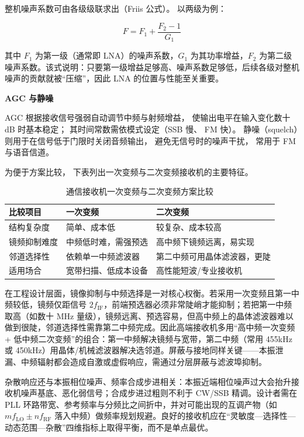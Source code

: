 整机噪声系数可由各级级联求出（Friis 公式）。
以两级为例：

\[
F=F_1+\frac{F_2-1}{G_1}
\]

其中 $F_1$ 为第一级（通常即 LNA）的噪声系数，$G_1$ 为其功率增益，$F_2$ 为第二级噪声系数。该式说明：只要第一级增益足够高、噪声系数足够低，后续各级对整机噪声的贡献就被“压缩”，因此 LNA 的位置与性能至关重要。

\medskip\noindent\textbf{AGC 与静噪}

AGC 根据接收信号强弱自动调节中频与射频增益，
使输出电平在输入变化数十 dB 时基本稳定；
其时间常数需依模式设定（SSB 慢、
FM 快）。
静噪（squelch）则用于在信号低于门限时关闭音频输出，
避免无信号时的噪声干扰，
常用于 FM 与语音信道。

为便于方案比较，
下表列出一次变频与二次变频接收机的主要特征。

\begin{table}[htbp]
\centering
\caption{通信接收机一次变频与二次变频方案比较}
\begin{tabular}{|p{4.5cm}|p{5cm}|p{5cm}|}
\hline
\textbf{比较项目} & \textbf{一次变频} & \textbf{二次变频} \\
\hline
结构复杂度 & 简单、成本低 & 较复杂、成本较高 \\
\hline
镜频抑制难度 & 中频低时难，需强预选 & 高中频下镜频远离，易实现 \\
\hline
邻道选择性 & 依赖单一中频滤波器 & 第二中频可用晶体滤波器，更陡 \\
\hline
适用场合 & 宽带扫描、低成本设备 & 高性能短波/专业接收机 \\
\hline
\end{tabular}
\end{table}

在工程设计层面，镜像抑制与中频选择是一对核心权衡。若采用一次变频且第一中频较低，镜频仅距信号 $2f_{\mathrm{IF}}$，前端预选器必须非常陡峭才能抑制；若把第一中频取高（如数十 MHz 量级），镜频远离、预选容易，但高中频上的晶体滤波器难以做到很陡，邻道选择性需靠第二中频完成。因此高端接收机多用“高中频一次变频 + 低中频二次变频”的组合：第一中频解决镜频与宽带，第二中频（常用 455kHz 或 450kHz）用晶体/机械滤波器解决选邻道。屏蔽与接地同样关键——本振泄漏、中频辐射都会造成自激或虚假响应，需通过分层屏蔽与滤波埠抑制。

杂散响应还与本振相位噪声、频率合成步进相关：本振近端相位噪声过大会抬升接收机噪声基底、恶化弱信号；合成步进过粗则不利于 CW/SSB 精调。设计者需在 PLL 环路带宽、参考频率与分频比之间折中，并对可能出现的互调产物（如 $m f_{\mathrm{LO}} \pm n f_{\mathrm{RF}}$ 落入中频）做频率规划规避。良好的接收机应在“灵敏度—选择性—动态范围—杂散”四维指标上取得平衡，而不是单点最优。

